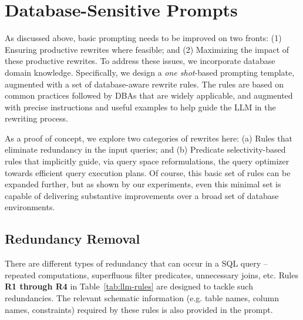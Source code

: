 \section{Database-Sensitive Prompts}
\label{sec:dbms-proficient-prompts}
As discussed above, basic prompting needs to be improved on two fronts: (1) Ensuring productive rewrites where feasible; and (2) Maximizing the impact of these productive rewrites.
To address these issues, we incorporate database domain knowledge. Specifically, we design a \textit{one shot}-based prompting template, augmented with a set of database-aware rewrite rules.
%
The rules are based on common practices followed by DBAs that are widely applicable, 
and augmented with precise instructions and useful examples to help guide the LLM in the rewriting process. 

As a proof of concept, we explore two categories of rewrites here: (a) Rules that eliminate redundancy in the input queries; and (b) Predicate selectivity-based rules that implicitly guide, via query space reformulations, the query optimizer towards efficient query execution plans.
Of course, 
this basic set of rules can be expanded further, but as shown by our experiments, even this minimal set is capable of delivering substantive improvements over a broad set of database environments.


\subsection{Redundancy Removal}
\label{sec:rules-prompt}

There are different types of redundancy that can occur in a SQL query -- repeated computations, superfluous filter predicates, unnecessary joins, etc. Rules {\bf R1 through R4} in Table~\ref{tab:llm-rules} are designed to tackle such redundancies. 
The relevant schematic information (e.g. table names, column names, constraints) required by these rules is also provided in the prompt.

